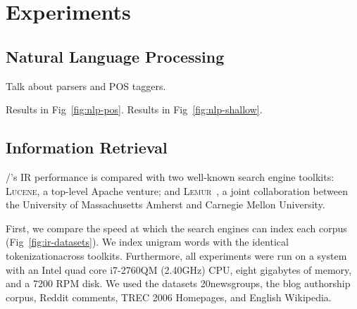 \section{Experiments}

\subsection{Natural Language Processing}

Talk about parsers and POS taggers.

Results in Fig~\ref{fig:nlp-pos}.
Results in Fig~\ref{fig:nlp-shallow}.





\subsection{Information Retrieval}

\meta/'s IR performance is compared with two well-known search engine toolkits:
\textsc{Lucene}\footnotemark[12], a top-level Apache venture; and
\textsc{Lemur}~\cite{lemur}, a joint collaboration between the University of
Massachusetts Amherst and Carnegie Mellon University.


First, we compare the speed at which the search engines can index each corpus
(Fig~\ref{fig:ir-datasets}). We index unigram words with the identical
tokenization\footnotemark[1] across toolkits. Furthermore, all experiments were
run on a system with an Intel quad core i7-2760QM (2.40GHz) CPU, eight gigabytes
of memory, and a 7200 RPM disk. We used the datasets
20newsgroups\footnotemark[6], the blog authorship corpus\footnotemark[7], Reddit
comments\footnotemark[5], TREC 2006 Homepages\footnotemark[8], and English
Wikipedia\footnotemark[9].




